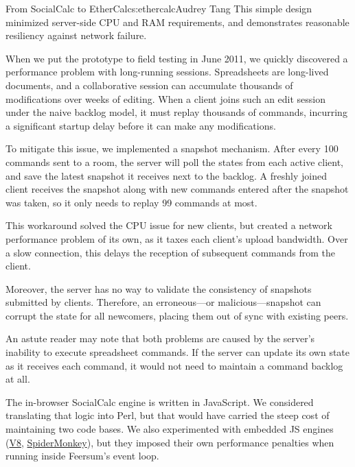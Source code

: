 \begin{aosachapter}{From SocialCalc to EtherCalc}{s:ethercalc}{Audrey Tang}
This simple design minimized server-side CPU and RAM requirements, and
demonstrates reasonable resiliency against network failure.


When we put the prototype to field testing in June 2011, we quickly
discovered a performance problem with long-running sessions.
Spreadsheets are long-lived documents, and a collaborative session can
accumulate thousands of modifications over weeks of editing. When a
client joins such an edit session under the naive backlog model, it must
replay thousands of commands, incurring a significant startup delay
before it can make any modifications.

To mitigate this issue, we implemented a snapshot mechanism. After every
100 commands sent to a room, the server will poll the states from each
active client, and save the latest snapshot it receives next to the
backlog. A freshly joined client receives the snapshot along with new
commands entered after the snapshot was taken, so it only needs to
replay 99 commands at most.


This workaround solved the CPU issue for new clients, but created a
network performance problem of its own, as it taxes each client's upload
bandwidth. Over a slow connection, this delays the reception of
subsequent commands from the client.

Moreover, the server has no way to validate the consistency of snapshots
submitted by clients. Therefore, an erroneous---or malicious---snapshot
can corrupt the state for all newcomers, placing them out of sync with
existing peers.

An astute reader may note that both problems are caused by the server's
inability to execute spreadsheet commands. If the server can update its
own state as it receives each command, it would not need to maintain a
command backlog at all.

The in-browser SocialCalc engine is written in JavaScript. We considered
translating that logic into Perl, but that would have carried the steep
cost of maintaining two code bases. We also experimented with embedded
JS engines (\href{https://metacpan.org/release/JavaScript-V8}{V8},
\href{https://metacpan.org/release/JavaScript-SpiderMonkey}{SpiderMonkey}),
but they imposed their own performance penalties when running inside
Feersum's event loop.


\end{aosachapter}
